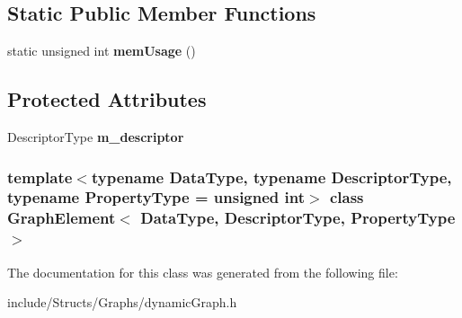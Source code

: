 \subsection*{Static Public Member Functions}
\begin{DoxyCompactItemize}
\item 
\hypertarget{class_graph_element_a0b76f46618de29e56f13cec6725b7d30}{
static unsigned int {\bfseries memUsage} ()}
\label{class_graph_element_a0b76f46618de29e56f13cec6725b7d30}

\end{DoxyCompactItemize}
\subsection*{Protected Attributes}
\begin{DoxyCompactItemize}
\item 
\hypertarget{class_graph_element_a8c2a1cb9d65fea4c9d3baebbbf34ee26}{
DescriptorType {\bfseries m\_\-descriptor}}
\label{class_graph_element_a8c2a1cb9d65fea4c9d3baebbbf34ee26}

\end{DoxyCompactItemize}
\subsubsection*{template$<$typename DataType, typename DescriptorType, typename PropertyType = unsigned int$>$ class GraphElement$<$ DataType, DescriptorType, PropertyType $>$}



The documentation for this class was generated from the following file:\begin{DoxyCompactItemize}
\item 
include/Structs/Graphs/dynamicGraph.h\end{DoxyCompactItemize}
